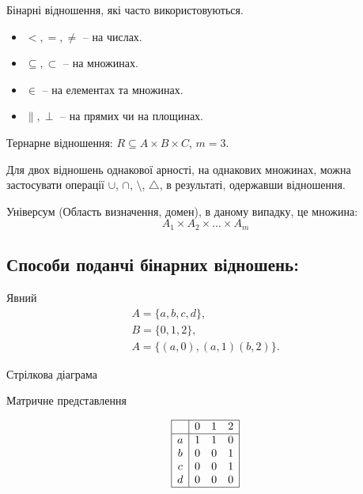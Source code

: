 \begin{example}
    Бінарні відношення, які часто використовуються.
    \begin{itemize}
        \item $<, =, \neq$ -- на числах.
        \item $\subseteq, \subset$ -- на множинах.
        \item $\in$ -- на елементах та множинах.
        \item $\parallel, \perp$ -- на прямих чи на площинах.
    \end{itemize}
\end{example}

\begin{definition}
    Тернарне відношення: $R \subseteq A \times B \times C$, $m = 3$.    
\end{definition}

Для двох відношень однакової арності, на
однакових множинах, можна застосувати операції
$\cup$, $\cap$, $\setminus$, $\triangle$, 
в результаті, одержавши відношення.

Універсум (Область визначення, домен), в даному випадку, це множина:
$$A_1 \times A_2 \times ... \times A_m$$

\subsection{Способи поданчі бінарних відношень:}

Явний
\begin{gather*}
    A = \{a, b, c, d\},\\
    B = \{0, 1, 2\},\\
    A = \{(a, 0), (a, 1) (b, 2)\}.
\end{gather*}

Стрілкова діаграма


Матричне представлення

\begin{equation*}
    \begin{array}{|c|ccc|}
        \hline
        & 0 & 1 & 2  \\
        \hline
        a & 1 & 1 & 0  \\
        b & 0 & 0 & 1  \\
        c & 0 & 0 & 1  \\
        d & 0 & 0 & 0  \\
        \hline
    \end{array}
\end{equation*}

